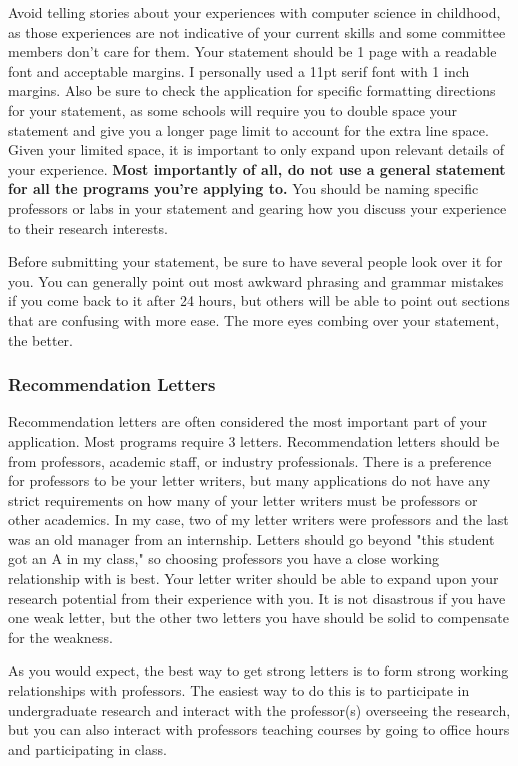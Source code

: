 \documentclass[12pt]{article}
\begin{document}
Avoid telling stories about your experiences with computer science in childhood, as those experiences are not indicative of your current skills and some committee members don't care for them. \cite{mightgradguide,vasansop} Your statement should be 1 page with a readable font and acceptable margins. I personally used a 11pt serif font with 1 inch margins. Also be sure to check the application for specific formatting directions for your statement, as some schools will require you to double space your statement and give you a longer page limit to account for the extra line space. Given your limited space, it is important to only expand upon relevant details of your experience. \textbf{Most importantly of all, do not use a general statement for all the programs you're applying to.} You should be naming specific professors or labs in your statement and gearing how you discuss your experience to their research interests.

Before submitting your statement, be sure to have several people look over it for you. You can generally point out most awkward phrasing and grammar mistakes if you come back to it after 24 hours, but others will be able to point out sections that are confusing with more ease. The more eyes combing over your statement, the better.

\subsubsection{Recommendation Letters}

Recommendation letters are often considered the most important part of your application. Most programs require 3 letters. Recommendation letters should be from professors, academic staff, or industry professionals. There is a preference for professors to be your letter writers, but many applications do not have any strict requirements on how many of your letter writers must be professors or other academics. In my case, two of my letter writers were professors and the last was an old manager from an internship. Letters should go beyond "this student got an A in my class," so choosing professors you have a close working relationship with is best. Your letter writer should be able to expand upon your research potential from their experience with you. It is not disastrous if you have one weak letter, but the other two letters you have should be solid to compensate for the weakness.

As you would expect, the best way to get strong letters is to form strong working relationships with professors. The easiest way to do this is to participate in undergraduate research and interact with the professor(s) overseeing the research, but you can also interact with professors teaching courses by going to office hours and participating in class.
\end{document}
